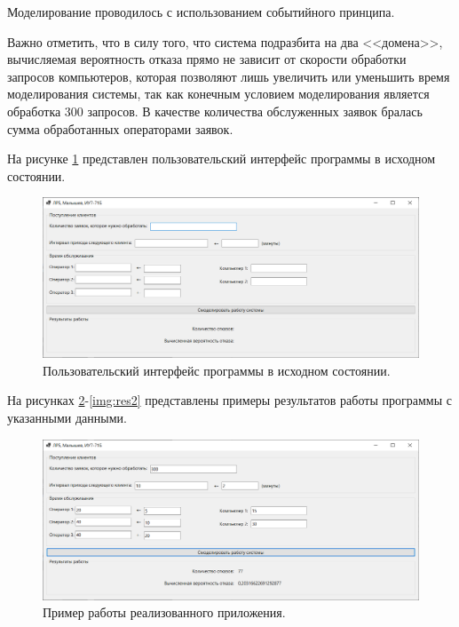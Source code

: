 \documentclass[14pt]{extreport}
\begin{document}
Моделирование проводилось с использованием событийного принципа.

Важно отметить, что в силу того, что система подразбита на два <<домена>>, вычисляемая вероятность отказа прямо не зависит от скорости обработки запросов компьютеров, которая позволяют лишь увеличить или уменьшить время моделирования системы, так как конечным условием моделирования является обработка 300 запросов. В качестве количества обслуженных заявок бралась сумма обработанных операторами заявок.

На рисунке \ref{img:ui} представлен пользовательский интерфейс программы в исходном состоянии.

\begin{figure}[H]
	\begin{center}
		\includegraphics[scale=0.8]{imgs/ui.png}
	\end{center}
	\caption{Пользовательский интерфейс программы в исходном состоянии.}
	\label{img:ui}
\end{figure}

На рисунках \ref{img:res1}-\ref{img:res2} представлены примеры результатов работы программы с указанными данными.

\begin{figure}[H]
	\begin{center}
		\includegraphics[scale=0.8]{imgs/res1.png}
	\end{center}
	\caption{Пример работы реализованного приложения.}
	\label{img:res1}
\end{figure}
\end{document}
